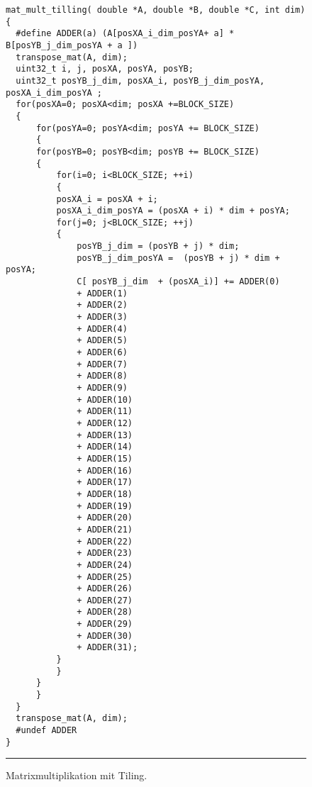 \lstset{language=c}
\begin{figure}[h]
 
\begin{lstlisting}
mat_mult_tilling( double *A, double *B, double *C, int dim)
{
  #define ADDER(a) (A[posXA_i_dim_posYA+ a] * B[posYB_j_dim_posYA + a ])
  transpose_mat(A, dim);
  uint32_t i, j, posXA, posYA, posYB;
  uint32_t posYB_j_dim, posXA_i, posYB_j_dim_posYA, posXA_i_dim_posYA ;
  for(posXA=0; posXA<dim; posXA +=BLOCK_SIZE)
  {
      for(posYA=0; posYA<dim; posYA += BLOCK_SIZE)
      {
	  for(posYB=0; posYB<dim; posYB += BLOCK_SIZE)
	  {
	      for(i=0; i<BLOCK_SIZE; ++i)
	      {
		  posXA_i = posXA + i;
		  posXA_i_dim_posYA = (posXA + i) * dim + posYA;
		  for(j=0; j<BLOCK_SIZE; ++j)
		  {
		      posYB_j_dim = (posYB + j) * dim;
		      posYB_j_dim_posYA =  (posYB + j) * dim + posYA;
		      C[ posYB_j_dim  + (posXA_i)] += ADDER(0)
			  + ADDER(1)
			  + ADDER(2)
			  + ADDER(3)
			  + ADDER(4)
			  + ADDER(5)
			  + ADDER(6)
			  + ADDER(7)
			  + ADDER(8)
			  + ADDER(9)
			  + ADDER(10)
			  + ADDER(11)
			  + ADDER(12)
			  + ADDER(13)
			  + ADDER(14)
			  + ADDER(15)
			  + ADDER(16)
			  + ADDER(17)
			  + ADDER(18)
			  + ADDER(19)
			  + ADDER(20)
			  + ADDER(21)
			  + ADDER(22)
			  + ADDER(23)
			  + ADDER(24)
			  + ADDER(25)
			  + ADDER(26)
			  + ADDER(27)
			  + ADDER(28)
			  + ADDER(29)
			  + ADDER(30)
			  + ADDER(31);
		  }
	      }
	  }
      }
  }
  transpose_mat(A, dim);
  #undef ADDER
}
\end{lstlisting}
\caption{Matrixmultiplikation mit Tiling.}
\noindent\rule{14cm}{0.4pt}
\label{FIGURETILING}
\end{figure}
